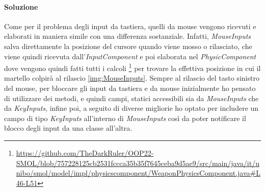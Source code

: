 \documentclass[a4paper,12pt]{report}
\begin{document}
\paragraph{Soluzione}
    Come per il problema degli input da tastiera, quelli da mouse vengono ricevuti e elaborati in maniera simile con una differenza
    sostanziale. Infatti, \emph{MouseInputs} salva direttamente la posizione del cursore
    quando viene mosso o rilasciato, che viene quindi ricevuta dall'\emph{InputComponent} e poi elaborata nel \emph{PhysicComponent} 
    dove vengono quindi fatti tutti i calcoli \footnote{\url{https://github.com/TheDarkRuler/OOP22-SMOL/blob/757228125cb2531fccca35b35f7645ceba9d5ae9/src/main/java/it/unibo/smol/model/impl/physicscomponent/WeaponPhysicsComponent.java#L46-L51}} 
    per trovare la effettiva posizione in cui il martello colpirà al rilascio \ref{img:MouseInputs}. Sempre al rilascio del tasto sinistro del mouse, 
    per bloccare gli input da tastiera e da mouse inizialmente ho pensato di utilizzare dei metodi, e quindi campi, statici 
    accessibili sia da \emph{MouseInputs} che da \emph{KeyInputs}, infine poi, a seguito di diverse migliorie 
    ho optato per includere un campo di tipo \emph{KeyInputs} all'interno di \emph{MouseInputs} così da poter notificare il blocco 
    degli input da una classe all'altra.
\end{document}
